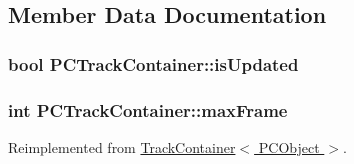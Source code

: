 \subsection{\-Member \-Data \-Documentation}
\hypertarget{class_p_c_track_container_a51514b479f4c23c13f412dc36766f73f}{
\subsubsection[{is\-Updated}]{\setlength{\rightskip}{0pt plus 5cm}bool {\bf \-P\-C\-Track\-Container\-::is\-Updated}}}\label{class_p_c_track_container_a51514b479f4c23c13f412dc36766f73f}
\hypertarget{class_p_c_track_container_afa0c55015d7b49548fa196d3091dacba}{
\subsubsection[{max\-Frame}]{\setlength{\rightskip}{0pt plus 5cm}int {\bf \-P\-C\-Track\-Container\-::max\-Frame}}}\label{class_p_c_track_container_afa0c55015d7b49548fa196d3091dacba}


\-Reimplemented from \hyperlink{class_track_container_a095e227d79bf2b5c25412aa983db0f60}{\-Track\-Container$<$ P\-C\-Object $>$}.


